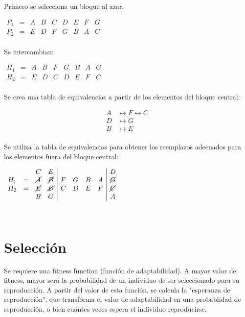\documentclass[10pt,a4paper]{article}
\begin{document}
Primero se selecciona un bloque al azar.

\begin{center}
$\begin{array}{cccc|cccc|c}
P_1 &= &A&B&C&D&E&F&G\\
P_2 &= &E&D&F&G&B&A&C\\
\end{array}$
\end{center}

Se intercambian:

\begin{center}
$\begin{array}{cccc|cccc|c}
H_1 &= &A&B&F&G&B&A&G\\
H_2 &= &E&D&C&D&E&F&C\\
\end{array}$
\end{center}

Se crea una tabla de equivalencias a partir de los elementos del bloque central:

\begin{center}
\begin{align*}
A &\leftrightarrow F \leftrightarrow C\\
D&\leftrightarrow  G\\
B&\leftrightarrow  E \\
\end{align*}
\end{center}

Se utiliza la tabla de equivalencias para obtener los reemplazos adecuados para los elementos fuera del bloque central:

\begin{center}
$\begin{array}{cccc|cccc|c}
        &    & C&E&&&&&D\\
H_1 &= &\cancel{A}&\cancel{B}&F&G&B&A&\cancel{G}\\
H_2 &= &\cancel{E}&\cancel{D}&C&D&E&F&\cancel{C}\\
        &    & B&G&&&&&A\\
\end{array}$
\end{center}

 

\section*{Selección}

Se requiere una fitness function (función de adaptabilidad). A mayor valor de fitness, mayor será la probabilidad de un individuo de ser seleccionado para su reproducción. A partir del valor de esta función, se calcula la "esperanza de reproducción", que transforma el valor de adaptabilidad en una probablidad de reproducción, o bien cuántes veces espera el individuo reproducirse.
\end{document}
